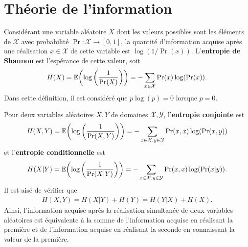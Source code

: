 \begin{comment}
\end{comment}

\appendix

\chapter{Théorie de l'information}
\label{chap:theo_info}

Considérant une variable aléatoire $X$ dont les valeurs possibles sont les éléments de $\mathcal X$
avec probabilité $\Pr: \mathcal X \to [0, 1]$,
la quantité d'information acquise après une réalisation $x \in \mathcal X$ de cette variable
est $\log(1/\Pr(x))$.
L'\textbf{entropie de Shannon} est l'espérance de cette valeur, soit 
\begin{align}
  H(X) = \mathbb E\qty(\log\qty(\frac{1}{\Pr(X)})) = -\sum_{x\in\mathcal X}\Pr(x) \log(\Pr (x)).
\end{align}
Dans cette définition,
il est considéré que $p\log(p) = 0$ lorsque $p = 0$.

Pour deux variables aléatoires $X, Y$ de domaines $\mathcal X, \mathcal Y$,
l'\textbf{entropie conjointe} est 
\begin{align}
  H(X, Y) 
  = \mathbb E\qty(\log\qty(\frac{1}{\Pr(X, Y)})) 
  = -\sum_{x\in\mathcal X, y \in\mathcal Y}\Pr(x, x) \log(\Pr(x, y))
\end{align}
et l'\textbf{entropie conditionnelle} est
\begin{align}
  H(X | Y) 
  = \mathbb E\qty(\log\qty(\frac{1}{\Pr(X|Y)})) 
  = -\sum_{x\in\mathcal X, y \in\mathcal Y}\Pr(x, x) \log(\Pr(x|y)).
\end{align}
Il est aisé de vérifier que 
\begin{align}
  H(X, Y) = H(X | Y) + H(Y) = H(Y | X) + H(X).
\end{align}
Ainsi,
l'information acquise après la réalisation simultanée de deux variables aléatoires
est équivalente à la somme de l'information acquise en réalisant la première 
et de l'information acquise en réalisant la seconde en connaissant la valeur de la première.

